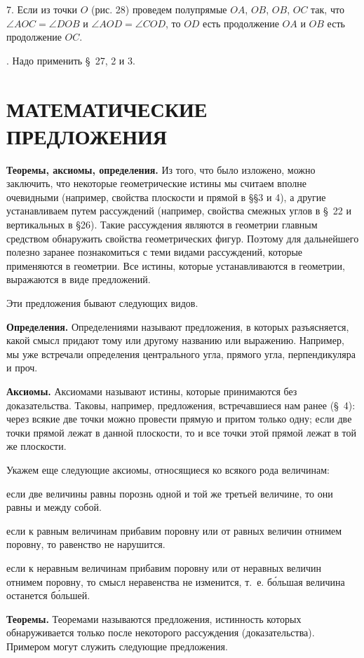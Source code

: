 \documentclass[oneside]{book}
\begin{document}
7.
Если из точки $O$ (рис. 28) проведем полупрямые $OA$, $OB$, $OB$, $OC$ так, что $\angle AOC = \angle DOB$ и $\angle AOD=\angle COD$, то $OD$ есть продолжение $OA$ и $OB$ есть продолжение $OC$.

.
Надо применить §~27, 2 и 3.

\section{МАТЕМАТИЧЕСКИЕ ПРЕДЛОЖЕНИЯ}



\textbf{Теоремы, аксиомы, определения.}
Из того, что было изложено, можно заключить, что некоторые геометрические истины мы считаем вполне очевидными (например, свойства плоскости и прямой в §§3 и 4), а другие устанавливаем путем рассуждений (например, свойства смежных углов в §~22 и вертикальных в §26).
Такие рассуждения являются в геометрии главным средством обнаружить свойства геометрических фигур.
Поэтому для дальнейшего полезно заранее познакомиться с теми видами рассуждений, которые применяются в геометрии.
Все истины, которые устанавливаются в геометрии, выражаются в виде предложений.

Эти предложения бывают следующих видов.

\textbf{Определения.}
Определениями называют предложения, в которых разъясняется, какой смысл придают тому или другому названию или выражению.
Например, мы уже встречали определения центрального угла, прямого угла, перпендикуляра и проч.

\textbf{Аксиомы.}
Аксиомами называют истины, которые принимаются без доказательства.
Таковы, например, предложения, встречавшиеся нам ранее (§~4):
через всякие две точки можно провести прямую и притом только одну;
если две точки прямой лежат в данной плоскости, то и все точки этой прямой лежат в той же плоскости.

Укажем еще следующие аксиомы, относящиеся ко всякого рода величинам:

если две величины равны порознь одной и той же третьей величине, то они равны и между собой.

если к равным величинам прибавим поровну или от равных величин отнимем поровну, то равенство не нарушится.

если к неравным величинам прибавим поровну или от неравных величин отнимем поровну, то смысл неравенства не изменится, т.~е. б\'{о}льшая величина останется б\'{о}льшей.

\textbf{Теоремы.}
Теоремами называются предложения, истинность которых обнаруживается только после некоторого рассуждения (доказательства).
Примером могут служить следующие предложения.
\end{document}
